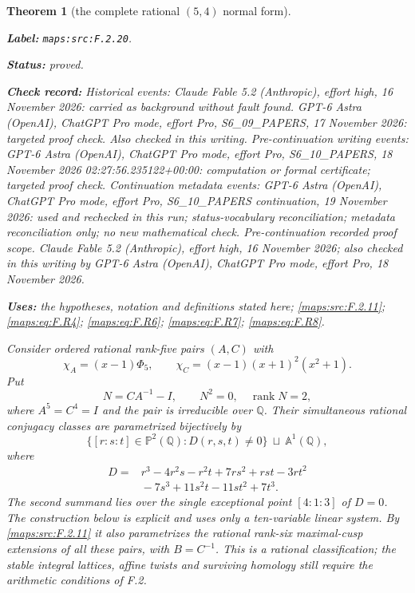 \documentclass[11pt,a4paper]{article}
\newtheorem{theorem}{Theorem}[section]
\theoremstyle{definition}
\newcommand{\StatementRecord}[4]{\par\smallskip\begingroup\upshape\raggedright\noindent\textbf{Label:} \nolinkurl{#1}.\par\noindent\textbf{Status:} #2.\par\noindent\textbf{Check record:} #3.\par\noindent\textbf{Uses:} #4.\par\endgroup\smallskip}
\begin{document}
\begin{theorem}[the complete rational $(5,4)$ normal form]\label{maps:src:F.2.20}
\StatementRecord{maps:src:F.2.20}{proved}{Historical events: Claude Fable 5.2 (Anthropic), effort high, 16 November 2026: carried as background without fault found. GPT-6 Astra (OpenAI), ChatGPT Pro mode, effort Pro, S6\_09\_PAPERS, 17 November 2026: targeted proof check. Also checked in this writing. Pre-continuation writing events: GPT-6 Astra (OpenAI), ChatGPT Pro mode, effort Pro, S6\_10\_PAPERS, 18 November 2026 02:27:56.235122+00:00: computation or formal certificate; targeted proof check. Continuation metadata events: GPT-6 Astra (OpenAI), ChatGPT Pro mode, effort Pro, S6\_10\_PAPERS continuation, 19 November 2026: used and rechecked in this run; status-vocabulary reconciliation; metadata reconciliation only; no new mathematical check. \emph{Pre-continuation recorded proof scope.} Claude Fable 5.2 (Anthropic), effort high, 16 November 2026; also checked in this writing by GPT-6 Astra (OpenAI), ChatGPT Pro mode, effort Pro, 18 November 2026}{the hypotheses, notation and definitions stated here; \cref{maps:src:F.2.11}; \cref{maps:eq:F.R4}; \cref{maps:eq:F.R6}; \cref{maps:eq:F.R7}; \cref{maps:eq:F.R8}}


Consider ordered rational rank-five pairs $(A,C)$ with
\[
 \chi_A=(x-1)\Phi_5,
 \qquad \chi_C=(x-1)(x+1)^2(x^2+1).
\]
Put
\[
 N=CA^{-1}-I,
 \qquad N^2=0,\quad\operatorname{rank}N=2,
\]
where $A^5=C^4=I$ and the pair is irreducible over $\mathbb Q$.
Their simultaneous rational conjugacy classes are parametrized
bijectively by
\[
 \bigl\{[r:s:t]\in\mathbb P^2(\mathbb Q):D(r,s,t)\ne0\bigr\}
 \ \sqcup\ \mathbb A^1(\mathbb Q),
 \tag{F.R1}\label{maps:eq:F.R1}
\]
where
\[
\begin{split}
 D={}&r^3-4r^2s-r^2t+7rs^2+rst-3rt^2\\
     &{}-7s^3+11s^2t-11st^2+7t^3.
\end{split}
 \tag{F.R2}\label{maps:eq:F.R2}
\]
The second summand lies over the single exceptional point
$[4:1:3]$ of $D=0$.  The construction below is explicit and
uses only a ten-variable linear system.  By \ref{maps:src:F.2.11} it also
parametrizes the rational rank-six maximal-cusp extensions
of all these pairs, with $B=C^{-1}$.
This is a rational classification; the stable integral
lattices, affine twists and surviving homology still require
the arithmetic conditions of F.2.

\end{theorem}
\end{document}
